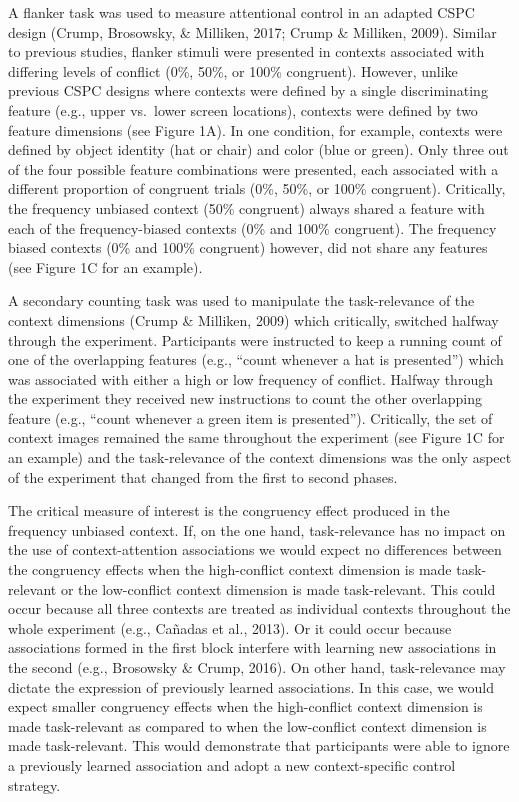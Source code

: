 \documentclass[english,,man,floatsintext]{apa6}
\begin{document}
A flanker task was used to measure attentional control in an adapted CSPC design (Crump, Brosowsky, \& Milliken, 2017; Crump \& Milliken, 2009). Similar to previous studies, flanker stimuli were presented in contexts associated with differing levels of conflict (0\%, 50\%, or 100\% congruent). However, unlike previous CSPC designs where contexts were defined by a single discriminating feature (e.g., upper vs.~lower screen locations), contexts were defined by two feature dimensions (see Figure 1A). In one condition, for example, contexts were defined by object identity (hat or chair) and color (blue or green). Only three out of the four possible feature combinations were presented, each associated with a different proportion of congruent trials (0\%, 50\%, or 100\% congruent). Critically, the frequency unbiased context (50\% congruent) always shared a feature with each of the frequency-biased contexts (0\% and 100\% congruent). The frequency biased contexts (0\% and 100\% congruent) however, did not share any features (see Figure 1C for an example).

A secondary counting task was used to manipulate the task-relevance of the context dimensions (Crump \& Milliken, 2009) which critically, switched halfway through the experiment. Participants were instructed to keep a running count of one of the overlapping features (e.g., \enquote{count whenever a hat is presented}) which was associated with either a high or low frequency of conflict. Halfway through the experiment they received new instructions to count the other overlapping feature (e.g., \enquote{count whenever a green item is presented}). Critically, the set of context images remained the same throughout the experiment (see Figure 1C for an example) and the task-relevance of the context dimensions was the only aspect of the experiment that changed from the first to second phases.

The critical measure of interest is the congruency effect produced in the frequency unbiased context. If, on the one hand, task-relevance has no impact on the use of context-attention associations we would expect no differences between the congruency effects when the high-conflict context dimension is made task-relevant or the low-conflict context dimension is made task-relevant. This could occur because all three contexts are treated as individual contexts throughout the whole experiment (e.g., Cañadas et al., 2013). Or it could occur because associations formed in the first block interfere with learning new associations in the second (e.g., Brosowsky \& Crump, 2016). On other hand, task-relevance may dictate the expression of previously learned associations. In this case, we would expect smaller congruency effects when the high-conflict context dimension is made task-relevant as compared to when the low-conflict context dimension is made task-relevant. This would demonstrate that participants were able to ignore a previously learned association and adopt a new context-specific control strategy.
\end{document}
